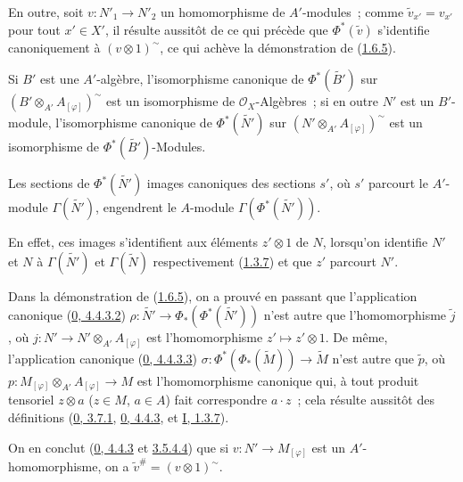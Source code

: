 En outre, soit $v:N'_1\to N'_2$ un homomorphisme de $A'$-modules~; comme
$\widetilde{v}_{x'}=v_{x'}$ pour tout $x'\in X'$, il résulte aussitôt de ce
qui précède que $\Phi^*(\widetilde{v})$ s'identifie canoniquement à
$(v\otimes 1)^{\sim}$, ce qui achève la démonstration de
(\hyperref[I.1.6.5-fr]{1.6.5}).

Si $B'$ est une $A'$-algèbre, l'isomorphisme canonique de
$\Phi^*(\widetilde{B'})$ sur
$(B'\otimes_{A'}A_{[\varphi]})^{\sim}$ est un isomorphisme de
$\mathscr{O}_X$-Algèbres~; si en outre $N'$ est un $B'$-module,
l'isomorphisme canonique de $\Phi^*(\widetilde{N'})$ sur
$(N'\otimes_{A'}A_{[\varphi]})^{\sim}$ est un isomorphisme de
$\Phi^*(\widetilde{B'})$-Modules.

\begin{corollary}[1.6.6]
\label{I.1.6.6-fr}
Les sections de $\Phi^*(\widetilde{N'})$ images canoniques des sections $s'$,
où $s'$ parcourt le $A'$-module $\Gamma(\widetilde{N'})$, engendrent le
$A$-module $\Gamma(\Phi^*(\widetilde{N'}))$.
\end{corollary}

En effet, ces images s'identifient aux éléments $z'\otimes 1$ de $N$,
lorsqu'on identifie $N'$ et $N$ à $\Gamma(\widetilde{N'})$ et
$\Gamma(\widetilde{N})$ respectivement (\hyperref[I.1.3.7-fr]{1.3.7}) et
que $z'$ parcourt $N'$.

\begin{env}[1.6.7]
\label{I.1.6.7-fr}
Dans la démonstration de (\hyperref[I.1.6.5-fr]{1.6.5}), on a prouvé en
passant que l'application canonique
(\hyperref[0.4.4.3.2-fr]{0, 4.4.3.2})
$\rho:\widetilde{N'}\to\Phi_*(\Phi^*(\widetilde{N'}))$ n'est autre que
l'homomorphisme $\widetilde{j}$,
où $j:N'\to N'\otimes_{A'}A_{[\varphi]}$ est l'homomorphisme
$z'\mapsto z'\otimes 1$. De même, l'application canonique
(\hyperref[0.4.4.3.3-fr]{0, 4.4.3.3})
$\sigma:\Phi^*(\Phi_*(\widetilde{M}))\to\widetilde{M}$ n'est autre que
$\widetilde{p}$, où
$p:M_{[\varphi]}\otimes_{A'}A_{[\varphi]}\to M$ est l'homomorphisme
canonique qui, à tout produit tensoriel $z\otimes a$ ($z\in M$, $a\in A$)
fait correspondre $a\cdot z$~; cela résulte aussitôt des définitions
(\hyperref[0.3.7.1-fr]{0, 3.7.1},
\hyperref[0.4.4.3-fr]{0, 4.4.3}, et
\hyperref[I.1.3.7-fr]{I, 1.3.7}).

On en conclut (\hyperref[0.4.4.3-fr]{0, 4.4.3} et
\hyperref[0.3.5.4.4-fr]{3.5.4.4}) que si
$v:N'\to M_{[\varphi]}$ est un $A'$-homomorphisme, on a
$\widetilde{v}^{\#}=(v\otimes 1)^{\sim}$.
\end{env}

